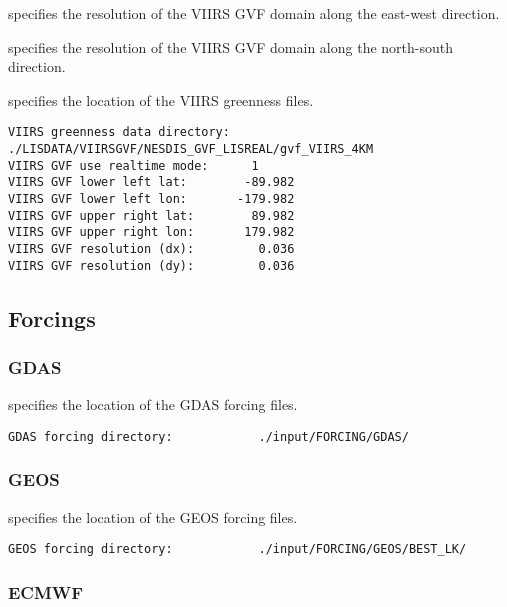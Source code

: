   specifies the resolution of the 
 VIIRS GVF domain along the east-west direction.

  specifies the resolution of the 
 VIIRS GVF domain along the north-south direction.

  specifies the location of
 the VIIRS greenness files.
 

 \begin{Verbatim}[frame=single]
VIIRS greenness data directory:  ./LISDATA/VIIRSGVF/NESDIS_GVF_LISREAL/gvf_VIIRS_4KM
VIIRS GVF use realtime mode:      1
VIIRS GVF lower left lat:        -89.982
VIIRS GVF lower left lon:       -179.982
VIIRS GVF upper right lat:        89.982
VIIRS GVF upper right lon:       179.982
VIIRS GVF resolution (dx):         0.036
VIIRS GVF resolution (dy):         0.036
 \end{Verbatim}

 
 \subsection{Forcings} \label{ssec:forcings}
 

 
 \subsubsection{GDAS} \label{sssec:forcings_gdas}
  specifies the location of the GDAS
 forcing files.
 

 \begin{Verbatim}[frame=single]
GDAS forcing directory:            ./input/FORCING/GDAS/
 \end{Verbatim}

 
 \subsubsection{GEOS} \label{sssec:forcings_geos}
 

 
  specifies the location of the GEOS
 forcing files.
 

 \begin{Verbatim}[frame=single]
GEOS forcing directory:            ./input/FORCING/GEOS/BEST_LK/
 \end{Verbatim}

 
 \subsubsection{ECMWF} \label{sssec:forcings_ecmwf}
 

